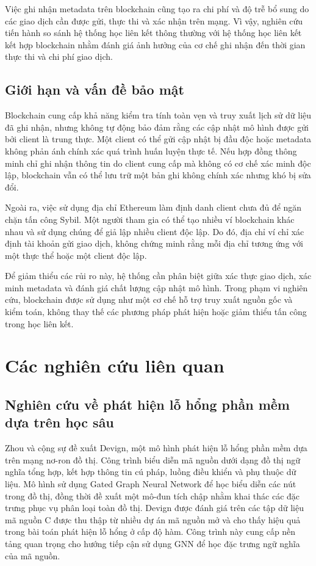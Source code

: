 Việc ghi nhận metadata trên blockchain cũng tạo ra chi phí và độ trễ bổ sung do các giao dịch cần
được gửi, thực thi và xác nhận trên mạng. Vì vậy, nghiên cứu tiến hành so sánh hệ thống học liên
kết thông thường với hệ thống học liên kết kết hợp blockchain nhằm đánh giá ảnh hưởng của cơ chế
ghi nhận đến thời gian thực thi và chi phí giao dịch.

\subsection{Giới hạn và vấn đề bảo mật}

Blockchain cung cấp khả năng kiểm tra tính toàn vẹn và truy xuất lịch sử dữ liệu đã ghi nhận, nhưng
không tự động bảo đảm rằng các cập nhật mô hình được gửi bởi client là trung thực. Một client có
thể gửi cập nhật bị đầu độc hoặc metadata không phản ánh chính xác quá trình huấn luyện thực tế.
Nếu hợp đồng thông minh chỉ ghi nhận thông tin do client cung cấp mà không có cơ chế xác minh độc
lập, blockchain vẫn có thể lưu trữ một bản ghi không chính xác nhưng khó bị sửa đổi.

Ngoài ra, việc sử dụng địa chỉ Ethereum làm định danh client chưa đủ để ngăn chặn tấn công Sybil.
Một người tham gia có thể tạo nhiều ví blockchain khác nhau và sử dụng chúng để giả lập nhiều
client độc lập. Do đó, địa chỉ ví chỉ xác định tài khoản gửi giao dịch, không chứng minh rằng mỗi
địa chỉ tương ứng với một thực thể hoặc một client độc lập.

Để giảm thiểu các rủi ro này, hệ thống cần phân biệt giữa xác thực giao dịch, xác minh metadata và đánh giá chất lượng cập nhật mô hình. Trong phạm vi nghiên cứu, blockchain được sử dụng như một cơ chế hỗ trợ truy xuất nguồn gốc và kiểm toán, không thay thế các phương pháp phát hiện hoặc giảm thiểu tấn công trong học liên kết.

\section{Các nghiên cứu liên quan}

\subsection{Nghiên cứu về phát hiện lỗ hổng phần mềm dựa trên học sâu}

Zhou và cộng sự \cite{zhou2019devign} đề xuất Devign, một mô hình phát hiện lỗ hổng phần mềm dựa
trên mạng nơ-ron đồ thị. Công trình biểu diễn mã nguồn dưới dạng đồ thị ngữ nghĩa tổng hợp, kết hợp
thông tin cú pháp, luồng điều khiển và phụ thuộc dữ liệu. Mô hình sử dụng Gated Graph Neural
Network để học biểu diễn các nút trong đồ thị, đồng thời đề xuất một mô-đun tích chập nhằm khai
thác các đặc trưng phục vụ phân loại toàn đồ thị. Devign được đánh giá trên các tập dữ liệu mã
nguồn C được thu thập từ nhiều dự án mã nguồn mở và cho thấy hiệu quả trong bài toán phát hiện lỗ
hổng ở cấp độ hàm. Công trình này cung cấp nền tảng quan trọng cho hướng tiếp cận sử dụng GNN để
học đặc trưng ngữ nghĩa của mã nguồn.


